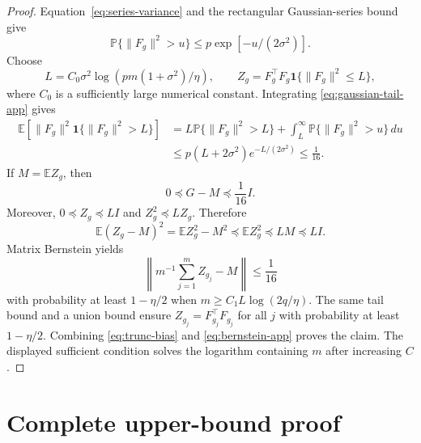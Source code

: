 \documentclass{article}
\theoremstyle{remark}
\newcommand{\E}{\mathbb E}
\newcommand{\Prb}{\mathbb P}
\newcommand{\1}{\mathbf 1}
\begin{document}
\begin{proof}
Equation~\eqref{eq:series-variance} and the rectangular Gaussian-series bound give
\begin{equation}
 \Prb\{\|F_g\|^2>u\}\le p\exp[-u/(2\sigma^2)].
 \label{eq:gaussian-tail-app}
\end{equation}
Choose \[ L=C_0\sigma^2\log(pm(1+\sigma^2)/\eta),\qquad Z_g=F_g^\top F_g\1\{\|F_g\|^2\le L\}, \] where $C_0$ is a sufficiently large numerical constant.  Integrating \eqref{eq:gaussian-tail-app} gives
\begin{align}
 \E[\|F_g\|^2\1\{\|F_g\|^2>L\}]
 &=L\Prb\{\|F_g\|^2>L\}
   +\int_L^\infty\Prb\{\|F_g\|^2>u\}\,du \\
 &\le p(L+2\sigma^2)e^{-L/(2\sigma^2)}\le\frac1{16}.
 \label{eq:tail-bias}
\end{align}
If $M=\E Z_g$, then
\begin{equation}
 0\preceq G-M\preceq\frac1{16}I.
 \label{eq:trunc-bias}
\end{equation}
Moreover, $0\preceq Z_g\preceq LI$ and $Z_g^2\preceq LZ_g$.  Therefore \[ \E(Z_g-M)^2=\E Z_g^2-M^2\preceq\E Z_g^2\preceq LM\preceq LI. \] Matrix Bernstein yields
\begin{equation}
 \left\|m^{-1}\sum_{j=1}^mZ_{g_j}-M\right\|\le\frac1{16}
 \label{eq:bernstein-app}
\end{equation}
with probability at least $1-\eta/2$ when $m\ge C_1L\log(2q/\eta)$.  The same tail bound and a union bound ensure $Z_{g_j}=F_{g_j}^\top F_{g_j}$ for all $j$ with probability at least $1-\eta/2$.  Combining \eqref{eq:trunc-bias} and \eqref{eq:bernstein-app} proves the claim.  The displayed sufficient condition solves the logarithm containing $m$ after increasing $C$.
\end{proof}

\section{Complete upper-bound proof}
\label{app:upper}
\end{document}
